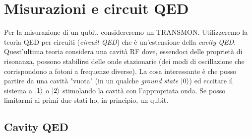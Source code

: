\section{Misurazioni e circuit QED}

Per la misurazione di un qubit, considereremo un TRANSMON. Utilizzeremo la teoria QED per circuiti (\textit{circuit QED}) che è un'estensione della \textit{cavity QED}. Quest'ultima teoria considera una cavità RF dove, essendoci delle proprietà di risonanza, possono stabilirsi delle onde stazionarie (dei modi di oscillazione che corrispondono a fotoni a frequenze diverse). 
La cosa interessante è che posso partire da una cavità "vuota" (in un qualche \textit{ground state} $\ket 0$) ed eccitare il sistema a $\ket 1$ o $\ket 2$ stimolando la cavità con l'appropriata onda.
Se posso limitarmi ai primi due stati ho, in principio, un qubit.

\subsection{Cavity QED}
